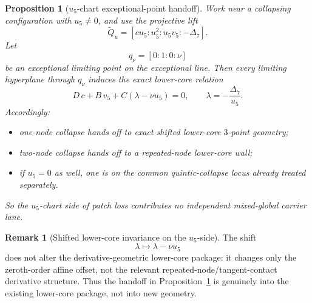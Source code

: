 \documentclass[11pt,a4paper]{amsart}
\theoremstyle{plain}
\newtheorem{proposition}[theorem]{Proposition}
\theoremstyle{definition}
\newtheorem{remark}[theorem]{Remark}
\begin{document}
\begin{proposition}[$u_5$-chart exceptional-point handoff]
\label{prop:u5-chart-exceptional-point-handoff}
Work near a collapsing configuration with $u_5\neq 0$, and use the projective
lift
\[
\widetilde Q_u=[c u_5:u_5^2:u_5v_5:-\Delta_7].
\]
Let
\[
q_\nu=[0:1:0:\nu]
\]
be an exceptional limiting point on the exceptional line. Then every limiting
hyperplane through $q_\nu$ induces the exact lower-core relation
\[
D\,c+B\,v_5+C(\lambda-\nu u_5)=0,
\qquad
\lambda=-\frac{\Delta_7}{u_5}.
\]
Accordingly:
\begin{itemize}
\item one-node collapse hands off to exact shifted lower-core $3$-point
geometry;
\item two-node collapse hands off to a repeated-node lower-core wall;
\item if $u_5=0$ as well, one is on the common quintic-collapse locus already
treated separately.
\end{itemize}
So the $u_5$-chart side of patch loss contributes no independent mixed-global
carrier lane.
\end{proposition}

\begin{remark}[Shifted lower-core invariance on the $u_5$-side]
\label{rem:shifted-lower-core-invariance-u5}
The shift
\[
\lambda\longmapsto \lambda-\nu u_5
\]
does not alter the derivative-geometric lower-core package: it changes only the
zeroth-order affine offset, not the relevant repeated-node/tangent-contact
derivative structure. Thus the handoff in
Proposition~\ref{prop:u5-chart-exceptional-point-handoff} is genuinely into the
existing lower-core package, not into new geometry.
\end{remark}
\end{document}
